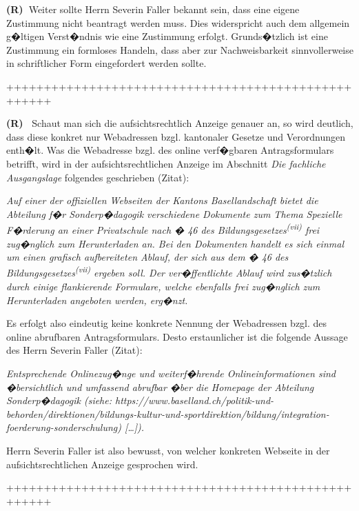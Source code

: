 \documentclass[paper=a4,fontsize=12pt, oneside, numbers=noenddot]{scrbook}
\newcounter{rz}
\newcommand{\Rz}{\addtocounter{rz}{1}\textbf{(R\arabic{rz})~}}
\newcommand{\RzLabel}[1]{\refstepcounter{rz}\label{#1}\textbf{(R\arabic{rz})~}}
\begin{document}
	
	
	
	
	
	
	
	\Rz Weiter sollte Herrn Severin Faller bekannt sein, dass eine eigene Zustimmung nicht beantragt werden muss. Dies widerspricht auch dem allgemein g�ltigen Verst�ndnis wie eine Zustimmung erfolgt. Grunds�tzlich ist eine Zustimmung ein formloses Handeln, dass aber zur Nachweisbarkeit sinnvollerweise in schriftlicher Form eingefordert werden sollte. 
	
	++++++++++++++++++++++++++++++++++++++++++++++++++++
	
	\RzLabel{WebseiteBekannt} Schaut man sich die aufsichtsrechtlich Anzeige genauer an, so wird deutlich, dass diese konkret nur Webadressen bzgl. kantonaler Gesetze und Verordnungen enth�lt. Was die Webadresse bzgl. des online verf�gbaren Antragsformulars betrifft, wird in der aufsichtsrechtlichen Anzeige im Abschnitt \textit{Die fachliche Ausgangslage} folgendes geschrieben (Zitat):
	\begin{addmargin}[2.5em]{0em}\emph{Auf einer der offiziellen Webseiten der Kantons Basellandschaft bietet die Abteilung f�r	Sonderp�dagogik verschiedene Dokumente zum Thema Spezielle F�rderung an einer Privatschule nach � 46 des Bildungsgesetzes\textsuperscript{(vii)} frei zug�nglich zum Herunterladen an. Bei den Dokumenten handelt es sich einmal um einen grafisch aufbereiteten Ablauf, der sich aus dem � 46 des Bildungsgesetzes\textsuperscript{(vii)} ergeben soll. Der ver�ffentlichte Ablauf wird zus�tzlich durch einige flankierende Formulare, welche ebenfalls frei zug�nglich zum Herunterladen angeboten werden, erg�nzt.}
	\end{addmargin}
	Es erfolgt also eindeutig keine konkrete Nennung der Webadressen bzgl. des online abrufbaren Antragsformulars. Desto erstaunlicher ist die folgende Aussage des Herrn Severin Faller (Zitat):
	
	\begin{addmargin}[2.5em]{0em}\emph{Entsprechende Onlinezug�nge und weiterf�hrende Onlineinformationen sind �bersichtlich und umfassend abrufbar �ber die Homepage der Abteilung Sonderp�dagogik (siehe: https://www.baselland.ch/politik-und-behorden/direktionen/bildungs-kultur-und-sportdirektion/bildung/integration-foerderung-sonderschulung) [\dots]).
	}\end{addmargin}
	Herrn Severin Faller ist also bewusst, von welcher konkreten Webseite in der aufsichtsrechtlichen Anzeige gesprochen wird.
	
	
	++++++++++++++++++++++++++++++++++++++++++++++++++++
	
\end{document}
